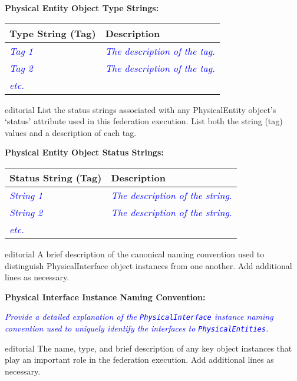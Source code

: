 \documentclass[11pt,english,letterpaper]{article}
\newcommand{\example}[1]{{\textcolor{blue}{\textit{#1}}}}
\begin{document}
\textbf{Physical Entity Object Type Strings: }

\begin{tabularx}{\textwidth}{|l|X|} \hline
Type String (Tag) & Description \\ \hline
\example{Tag 1} & \example{The description of the tag.} \\ \hline
\example{Tag 2} & \example{The description of the tag.} \\ \hline
\example{etc.} & \\ \hline
\end{tabularx}

\begin{shownto}{editorial}
{\color{red} List the status strings associated with any PhysicalEntity object's
`status' attribute used in this federation execution. List both the string (tag)
values and a description of each tag.}
\end{shownto}

\textbf{Physical Entity Object Status Strings: }

\begin{tabularx}{\textwidth}{|l|X|} \hline
Status String (Tag) & Description \\ \hline
\example{String 1} & \example{The description of the string.} \\ \hline
\example{String 2} & \example{The description of the string.} \\ \hline
\example{etc.} &  \\ \hline
\end{tabularx}

\begin{shownto}{editorial}
{\color{red} A brief description of the canonical naming convention used to
distinguish PhysicalInterface object instances from one another. Add additional
lines as necessary.}
\end{shownto}

\textbf{Physical Interface Instance Naming Convention: }

\example{Provide a detailed explanation of the \texttt{PhysicalInterface}
instance naming convention used to uniquely identify the interfaces to
\texttt{PhysicalEntities}.}

\begin{shownto}{editorial}
{\color{red} The name, type, and brief description of any key object instances
that play an important role in the federation execution. Add additional lines
as necessary.}
\end{shownto}
\end{document}
